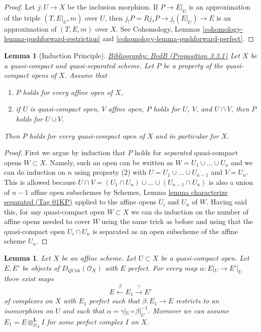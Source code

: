 \documentclass{amsart}
\newenvironment{reference}{\comment}{\endcomment}
\theoremstyle{plain}
\newtheorem{lemma}[subsection]{Lemma}
\theoremstyle{definition}
\theoremstyle{remark}
\numberwithin{equation}{subsection}
\def\QCoh{\mathit{QCoh}}
\begin{document}
\begin{proof}
Let $j : U \to X$ be the inclusion morphism.
If $P \to E|_U$ is an approximation of the triple $(T, E|_U, m)$
over $U$, then $j_!P = Rj_*P \to j_!(E|_U) \to E$ is an approximation
of $(T, E, m)$ over $X$.
See Cohomology, Lemmas \ref{cohomology-lemma-pushforward-restriction} and
\ref{cohomology-lemma-pushforward-perfect}.
\end{proof}


\begin{lemma}[Induction Principle]
\label{coherent-lemma-induction-principle}
\begin{reference}
\href{https://stacks.math.columbia.edu/bibliography}{Bibliography: BvdB (Proposition 3.3.1)}
\end{reference}
Let $X$ be a quasi-compact and quasi-separated scheme. Let $P$ be a property
of the quasi-compact opens of $X$. Assume that
\begin{enumerate}
\item $P$ holds for every affine open of $X$,
\item if $U$ is quasi-compact open, $V$ affine open,
$P$ holds for $U$, $V$, and $U \cap V$, then
$P$ holds for $U \cup V$.
\end{enumerate}
Then $P$ holds for every quasi-compact open of $X$
and in particular for $X$.
\end{lemma}

\begin{proof}
First we argue by induction that $P$ holds for {\it separated} quasi-compact
opens $W \subset X$. Namely, such an open can be written as
$W = U_1 \cup \ldots \cup U_n$ and we can do induction on $n$ using
property (2) with $U = U_1 \cup \ldots \cup U_{n - 1}$ and $V = U_n$.
This is allowed because
$U \cap V = (U_1 \cap U_n) \cup \ldots \cup (U_{n - 1} \cap U_n)$
is also a union of $n - 1$ affine open subschemes by
Schemes, Lemma \href{https://stacks.math.columbia.edu/tag/01KP}{lemma characterize separated (Tag 01KP)}
applied to the affine opens $U_i$ and $U_n$ of $W$.
Having said this, for any quasi-compact open $W \subset X$ we can
do induction on the number of affine opens needed to cover $W$
using the same trick as before and using that the quasi-compact open
$U_i \cap U_n$ is separated as an open subscheme of the affine scheme $U_n$.
\end{proof}


\begin{lemma}
\label{lemma-lift-map}
Let $X$ be an affine scheme. Let $U \subset X$ be a quasi-compact open.
Let $E, E'$ be objects of $D_\QCoh(\mathcal{O}_X)$ with $E$ perfect.
For every map $\alpha : E|_U \to E'|_U$ there exist maps
$$
E \xleftarrow{\beta} E_1 \xrightarrow{\gamma} E'
$$
of complexes on $X$ with $E_1$ perfect such that $\beta : E_1 \to E$
restricts to an isomorphism on $U$ and such that
$\alpha = \gamma|_U \circ \beta|_U^{-1}$.
Moreover we can assume $E_1 = E \otimes_{\mathcal{O}_X}^\mathbf{L} I$
for some perfect complex $I$ on $X$.
\end{lemma}
\end{document}
